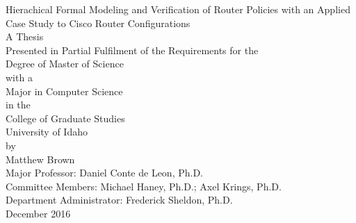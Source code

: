 \documentclass[12pt,letterpaper]{report}
\newcommand{\thesisTitle}{Hierachical Formal Modeling and Verification of Router Policies with an Applied Case Study to Cisco Router Configurations}
\newcommand{\myName}{Matthew Brown}
\newcommand{\degree}{Master of Science}
\newcommand{\major}{Computer Science}
\newcommand{\majorProf}{Daniel Conte de Leon}
\newcommand{\commiteMemA}{Michael Haney}
\newcommand{\commiteMemB}{Axel Krings}
\newcommand{\DeptAdmin}{Frederick Sheldon}
\begin{document}
\pagestyle{myheadings}

\thispagestyle{empty}

\vspace*{\fill}
\begin{center}
\thesisTitle\\
\vspace{48pt}
A Thesis\\
Presented in Partial Fulfilment of the Requirements for the\\
Degree of \degree\\
with a\\
Major in \major\\
in the\\
College of Graduate Studies\\
University of Idaho\\
by\\
\myName\\
\vspace{60pt}
Major Professor: \majorProf, Ph.D.\\
Committee Members: \commiteMemA, Ph.D.; \commiteMemB, Ph.D.\\
Department Administrator: \DeptAdmin, Ph.D.\\
\vspace{80pt}
December 2016
\end{center}
\vspace{\fill}
\pagebreak

\end{document}
